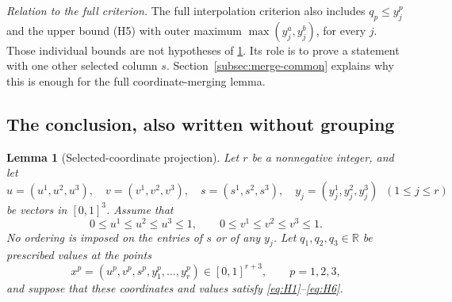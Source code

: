 \documentclass[a4paper,11pt]{amsart}
\numberwithin{equation}{section}
\newtheorem{lemma}[lemma]{Lemma}
\theoremstyle{definition}
\theoremstyle{remark}
\begin{document}
\noindent\emph{Relation to the full criterion.}
The full interpolation criterion also includes $q_p\le y_j^p$ and the
upper bound (H5) with outer maximum $\max(y_j^a,y_j^b)$, for every $j$.
Those individual bounds are not hypotheses of \cref{lem:merge-selected}. Its role is to
prove a statement with one other selected column $s$. Section~\ref{subsec:merge-common}
explains why this is enough for the full coordinate-merging lemma.


\subsection{The conclusion, also written without grouping}
\begin{lemma}[Selected-coordinate projection]
\label{lem:merge-selected}
Let $r$ be a nonnegative integer, and let
\[
 u=(u^1,u^2,u^3),\quad
 v=(v^1,v^2,v^3),\quad
 s=(s^1,s^2,s^3),\quad
 y_j=(y_j^1,y_j^2,y_j^3)\;\;(1\le j\le r)
\]
be vectors in $[0,1]^3$. Assume that
\[
 0\le u^1\le u^2\le u^3\le1,
 \qquad
 0\le v^1\le v^2\le v^3\le1.
\]
No ordering is imposed on the entries of $s$ or of any $y_j$.
Let $q_1,q_2,q_3\in\mathbb R$ be prescribed values at the points
\[
 x^p=(u^p,v^p,s^p,y_1^p,\ldots,y_r^p)\in[0,1]^{r+3},
 \qquad p=1,2,3,
\]
and suppose that these coordinates and values satisfy
\eqref{eq:H1}--\eqref{eq:H6}.


\end{lemma}
\end{document}
